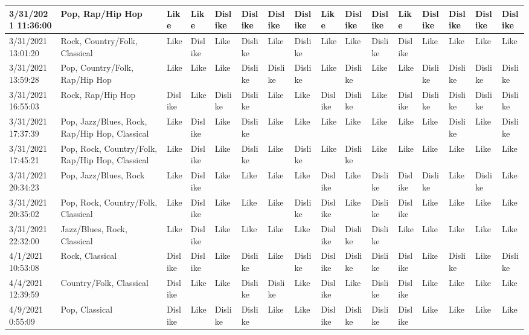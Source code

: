 \begin{table}
\begin{tabular}{|l|l|l|l|l|l|l|l|l|l|l|l|l|l|l|l|}
        3/31/2021 11:36:00 & Pop, Rap/Hip Hop & Like & Like & Dislike & Dislike & Dislike & Dislike & Like & Dislike & Dislike & Like & Dislike & Dislike & Dislike & Dislike \\ \hline
        3/31/2021 13:01:20 & Rock, Country/Folk, Classical & Like & Dislike & Like & Dislike & Like & Dislike & Like & Like & Dislike & Dislike & Like & Like & Like & Like \\ \hline
        3/31/2021 13:59:28 & Pop, Country/Folk, Rap/Hip Hop & Like & Like & Like & Dislike & Dislike & Dislike & Like & Dislike & Like & Like & Dislike & Dislike & Dislike & Dislike \\ \hline
        3/31/2021 16:55:03 & Rock, Rap/Hip Hop & Dislike & Like & Dislike & Dislike & Like & Like & Dislike & Dislike & Like & Dislike & Dislike & Dislike & Dislike & Dislike \\ \hline
        3/31/2021 17:37:39 & Pop, Jazz/Blues, Rock, Rap/Hip Hop, Classical & Like & Dislike & Like & Dislike & Like & Like & Like & Like & Like & Like & Like & Dislike & Like & Dislike \\ \hline
        3/31/2021 17:45:21 & Pop, Rock, Country/Folk, Rap/Hip Hop, Classical & Like & Dislike & Like & Dislike & Like & Dislike & Like & Dislike & Like & Like & Like & Like & Like & Like \\ \hline
        3/31/2021 20:34:23 & Pop, Jazz/Blues, Rock & Like & Dislike & Like & Like & Like & Like & Dislike & Like & Dislike & Dislike & Dislike & Like & Dislike & Like \\ \hline
        3/31/2021 20:35:02 & Pop, Rock, Country/Folk, Classical & Like & Dislike & Like & Like & Like & Dislike & Dislike & Like & Dislike & Dislike & Like & Like & Like & Like \\ \hline
        3/31/2021 22:32:00 & Jazz/Blues, Rock, Classical & Like & Dislike & Like & Like & Like & Like & Dislike & Dislike & Dislike & Like & Like & Like & Like & Like \\ \hline
        4/1/2021 10:53:08 & Rock, Classical & Dislike & Dislike & Like & Dislike & Like & Dislike & Dislike & Dislike & Dislike & Dislike & Like & Dislike & Like & Dislike \\ \hline
        4/4/2021 12:39:59 & Country/Folk, Classical & Dislike & Like & Like & Dislike & Dislike & Like & Dislike & Like & Dislike & Dislike & Like & Like & Like & Like \\ \hline
        4/9/2021 0:55:09 & Pop, Classical & Dislike & Like & Dislike & Dislike & Like & Like & Dislike & Dislike & Dislike & Dislike & Like & Like & Like & Like \\ \hline

\end{tabular}
\end{table}
